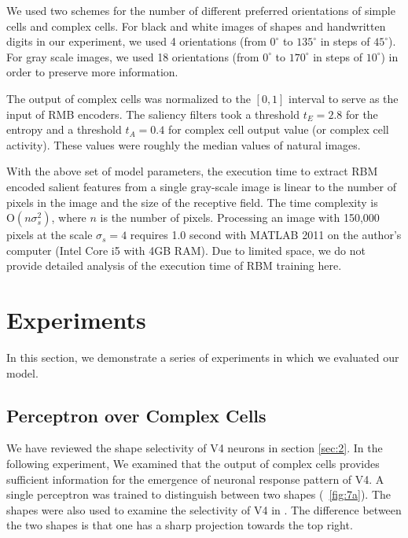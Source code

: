 \documentclass[conference]{IEEEtran}
\begin{document}
We used two schemes for the number of different preferred orientations of simple cells and complex cells.
For black and white images of shapes and handwritten digits in our experiment,
we used 4 orientations (from $0^\circ$ to $135^\circ$ in steps of $45^\circ$).
For gray scale images, we used 18 orientations (from $0^\circ$ to $170^\circ$ in steps of $10^\circ$)
in order to preserve more information.

The output of complex cells was normalized to the $[0,1]$ interval
to serve as the input of RMB encoders.
The saliency filters took a threshold $t_E=2.8$ for the entropy
and a threshold $t_A=0.4$ for complex cell output value (or complex cell activity).
These values were roughly the median values of natural images.

With the above set of model parameters,
the execution time to extract RBM encoded salient features from a single gray-scale image
is linear to the number of pixels in the image and the size of the receptive field.
The time complexity is $\mathrm{O}(n\sigma_s^2)$, where $n$ is the number of pixels.
Processing an image with 150,000 pixels at the scale $\sigma_s=4$ requires 1.0 second
with MATLAB 2011 on the author's computer (Intel Core i5 with 4GB RAM).
Due to limited space, we do not provide detailed analysis of the execution time of RBM training here.  

\section{Experiments}
\label{sec:4}

In this section, we demonstrate a series of experiments in which we evaluated our model.

\subsection{Perceptron over Complex Cells}

We have reviewed the shape selectivity of V4 neurons in section \ref{sec:2}.
In the following experiment, 
We examined that the output of complex cells provides sufficient information
for the emergence of neuronal response pattern of V4.
A single perceptron was trained to distinguish between two shapes (\figurename~\ref{fig:7a}).
The shapes were also used to examine the selectivity of V4 in \cite{pasupathy2001}.
The difference between the two shapes is that one has a sharp projection towards the top right.
\end{document}

